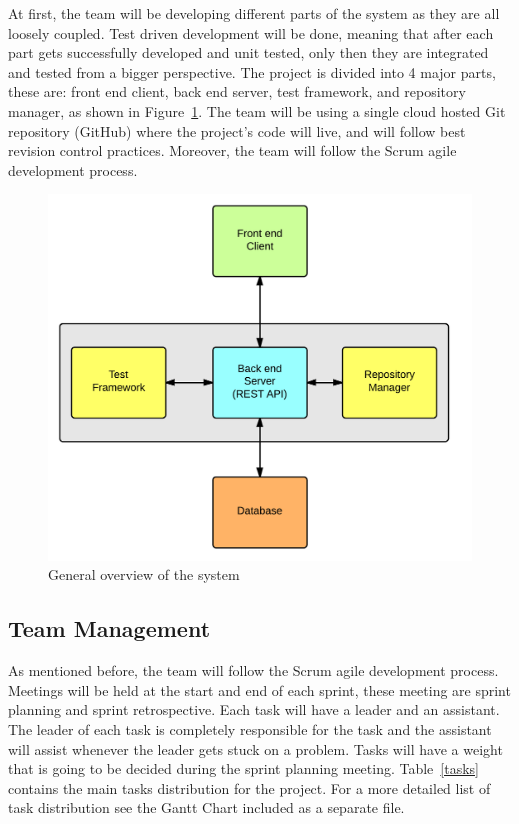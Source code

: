 
At first, the team will be developing different parts of
the system as they are all loosely coupled. Test driven development will be
done, meaning that after each part gets successfully developed and unit tested,
only then they are integrated and tested from a bigger perspective. The project
is divided into 4 major parts, these are: front end client, back end server,
test framework, and repository manager, as shown in Figure~\ref{arqu}. The team
will be using a single cloud hosted Git repository (GitHub) where the project's
code will live, and will follow best revision control practices. Moreover, the
team will follow the Scrum agile development process.

\begin{figure}[H]
	\centering
	\includegraphics[scale=0.25]{img/bigArquitectOverview}
	\caption{General overview of the system\label{arqu}}
\end{figure}

\subsection{Team Management}

As mentioned before, the team will follow the Scrum agile development process.
Meetings will be held at the start and end of each sprint, these meeting are
sprint planning and sprint retrospective. Each task will have a leader and an
assistant. The leader of each task is completely responsible for the task and
the assistant will assist whenever the leader gets stuck on a problem. Tasks
will have a weight that is going to be decided during the sprint planning
meeting. Table~\ref{tasks} contains the main tasks distribution for the project.
For a more detailed list of task distribution see the Gantt Chart included as a
separate file.

